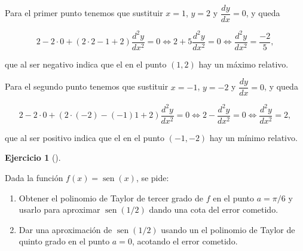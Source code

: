 \documentclass[
  a4paper,
]{scrreport}
\providecommand{\tightlist}{%
  \setlength{\itemsep}{0pt}\setlength{\parskip}{0pt}}\usepackage{longtable,booktabs,array}
\theoremstyle{definition}
\newtheorem{exercise}{Ejercicio}[chapter]
\theoremstyle{remark}
\begin{document}
\begin{tcolorbox}
\begin{enumerate}
  Para el primer punto tenemos que sustituir \(x=1\), \(y=2\) y
  \(\dfrac{dy}{dx}=0\), y queda

  \[
   2-2\cdot 0+(2\cdot 2-1+2)\frac{d^2y}{dx^2}=0 \Leftrightarrow 2+5\frac{d^2y}{dx^2}=0 \Leftrightarrow \frac{d^2y}{dx^2}=\frac{-2}{5},
   \]

  que al ser negativo indica que el en el punto \((1,2)\) hay un máximo
  relativo.

  Para el segundo punto tenemos que sustituir \(x=-1\), \(y=-2\) y
  \(\dfrac{dy}{dx}=0\), y queda

  \[
   2-2\cdot 0+(2\cdot (-2)-(-1)1+2)\frac{d^2y}{dx^2}=0 \Leftrightarrow 2-\frac{d^2y}{dx^2}=0 \Leftrightarrow \frac{d^2y}{dx^2}=2,
   \]

  que al ser positivo indica que el en el punto \((-1,-2)\) hay un
  mínimo relativo.
\end{enumerate}

\end{tcolorbox}

\begin{exercise}[]\protect\hypertarget{exr-taylor-1}{}\label{exr-taylor-1}

Dada la función \(f(x)=\operatorname{sen}(x)\), se pide:

\begin{enumerate}
\def\labelenumi{\alph{enumi}.}
\tightlist
\item
  Obtener el polinomio de Taylor de tercer grado de \(f\) en el punto
  \(a=\pi/6\) y usarlo para aproximar \(\operatorname{sen}(1/2)\) dando
  una cota del error cometido.
\item
  Dar una aproximación de \(\operatorname{sen}(1/2)\) usando un el
  polinomio de Taylor de quinto grado en el punto \(a=0\), acotando el
  error cometido.
\end{enumerate}

\end{exercise}
\end{document}
